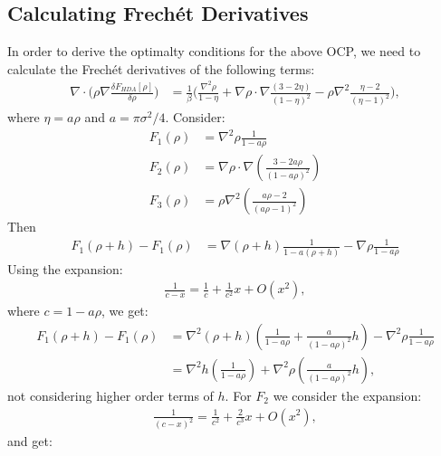 \documentclass[11pt, a4paper]{article}
\theoremstyle{definition}
\begin{document}
\subsection{Calculating Frech\'et Derivatives}
In order to derive the optimalty conditions for the above OCP, we need to calculate the Frech\'et derivatives of the following terms:
\begin{align*}
	\nabla \cdot \bigg(\rho \nabla \frac{\delta F_{HDA}[\rho]}{\delta \rho}\bigg)
	&= \frac{1}{\beta} \bigg( \frac{\nabla^2 \rho}{1 - \eta} +  \nabla \rho \cdot \nabla \frac{(3- 2 \eta)}{(1 - \eta)^2}  - \rho \nabla^2\frac{\eta - 2}{(\eta - 1)^2} \bigg),
\end{align*}
where $\eta = a \rho$ and $a = \pi \sigma^2 /4$.
Consider:
\begin{align*}
	F_1(\rho) &= \nabla^2 \rho \frac{1}{1- a\rho}\\
	F_2(\rho) &= \nabla \rho \cdot \nabla \left(\frac{3-2a\rho}{(1-a\rho)^2}\right)\\
	F_3(\rho) &= \rho \nabla^2 \left(\frac{a\rho -2}{(a\rho -1)^2}\right)
\end{align*}
Then
\begin{align*}
	F_1(\rho + h) - F_1(\rho) &= \nabla (\rho +h) \frac{1}{1- a(\rho +h)} - \nabla \rho \frac{1}{1- a\rho}
\end{align*}
Using the expansion: 
\begin{align*}
	\frac{1}{c - x} = \frac{1}{c} + \frac{1}{c^2}x + O(x^2),
\end{align*}
where $c = 1- a \rho$, we get:
\begin{align*}
	F_1(\rho + h) - F_1(\rho) &= \nabla^2 (\rho +h) \left(\frac{1}{1- a\rho} + \frac{a}{(1- a\rho)^2}h \right)- \nabla^2 \rho \frac{1}{1- a\rho}\\
	&= \nabla^2 h \left(\frac{1}{1- a\rho} \right) + \nabla^2 \rho \left(\frac{a}{(1- a\rho)^2}h\right),
\end{align*}
not considering higher order terms of $h$.
For $F_2$ we consider the expansion:
\begin{align*}
	\frac{1}{(c-x)^2} = \frac{1}{c^2} + \frac{2}{c^3}x + O(x^2),
\end{align*}
and get:
\end{document}
